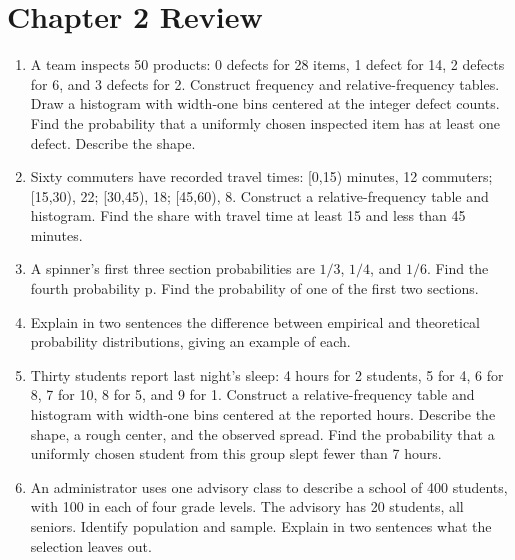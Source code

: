 \section*{Chapter 2 Review}
\begin{enumerate}[label=R\arabic*.,leftmargin=2.5em,itemsep=10pt]
\item A team inspects 50 products: 0 defects for 28 items, 1 defect for 14, 2 defects for 6, and 3 defects for 2. Construct frequency and relative-frequency tables. Draw a histogram with width-one bins centered at the integer defect counts. Find the probability that a uniformly chosen inspected item has at least one defect. Describe the shape.
\item Sixty commuters have recorded travel times: [0,15) minutes, 12 commuters; [15,30), 22; [30,45), 18; [45,60), 8. Construct a relative-frequency table and histogram. Find the share with travel time at least 15 and less than 45 minutes.
\item A spinner's first three section probabilities are $1/3$, $1/4$, and $1/6$. Find the fourth probability p. Find the probability of one of the first two sections.
\item Explain in two sentences the difference between empirical and theoretical probability distributions, giving an example of each.
\item Thirty students report last night's sleep: 4 hours for 2 students, 5 for 4, 6 for 8, 7 for 10, 8 for 5, and 9 for 1. Construct a relative-frequency table and histogram with width-one bins centered at the reported hours. Describe the shape, a rough center, and the observed spread. Find the probability that a uniformly chosen student from this group slept fewer than 7 hours.
\item An administrator uses one advisory class to describe a school of 400 students, with 100 in each of four grade levels. The advisory has 20 students, all seniors. Identify population and sample. Explain in two sentences what the selection leaves out.
\end{enumerate}
